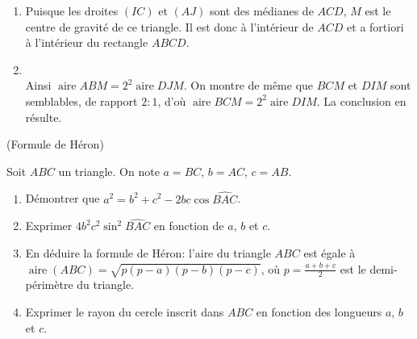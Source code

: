 \documentclass[a4paper,12pt,reqno]{amsart}
\DeclareMathOperator{\aire}{aire}
\begin{document}
\begin{solution}

    \begin{enumerate}
      \item Puisque les droites $(IC)$ et $(AJ)$ sont des médianes de $ACD$, $M$ est le centre de gravité de ce triangle. Il est donc à l'intérieur de $ACD$ et a fortiori à l'intérieur du rectangle $ABCD$.
      \item
      \\[3pt]
      Ainsi $\aire{ABM}=2^2\aire{DJM}$. On montre de même que $BCM$ et $DIM$ sont semblables, de rapport $2 \colon 1$, d'où  $\aire{BCM}=2^2\aire{DIM}$. La conclusion en résulte.
    \end{enumerate}
\end{solution}


\begin{exo}\label{heron} (Formule de Héron)

  Soit $ABC$ un triangle. On note $a=BC$, $b=AC$, $c=AB$.
  \begin{enumerate}
    \item\label{loicos} Démontrer que $a^2=b^2+c^2-2bc\cos\widehat{BAC}$.
    \item Exprimer $4b^2c^2\sin^2 \widehat{BAC}$ en fonction de $a$, $b$ et $c$.
    \item En déduire la formule de Héron: l'aire du triangle $ABC$ est égale à $\aire(ABC)=\sqrt{p(p-a)(p-b)(p-c)}$, où $p=\frac{a+b+c}{2}$ est le demi-périmètre du triangle.
    \item Exprimer le rayon du cercle inscrit dans $ABC$ en fonction des longueurs $a$, $b$ et $c$.
  \end{enumerate}
\end{exo}
\end{document}
